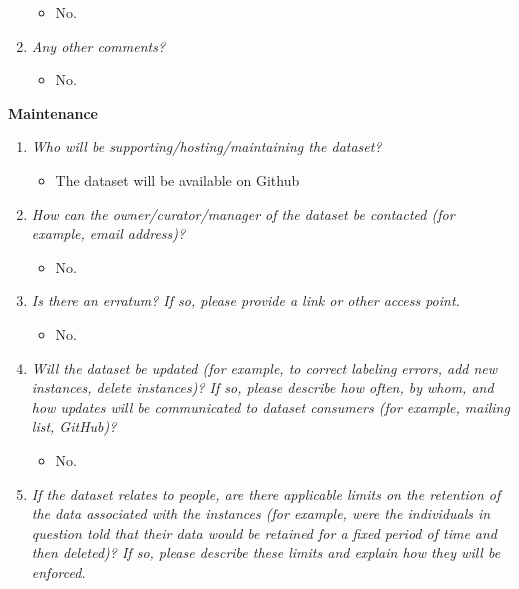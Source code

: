 \documentclass[
]{article}
\providecommand{\tightlist}{%
  \setlength{\itemsep}{0pt}\setlength{\parskip}{0pt}}
\begin{document}
\begin{enumerate}
  \begin{itemize}
  \tightlist
  \item
    No.
  \end{itemize}
\item
  \emph{Any other comments?}

  \begin{itemize}
  \tightlist
  \item
    No.
  \end{itemize}
\end{enumerate}

\textbf{Maintenance}

\begin{enumerate}
\def\labelenumi{\arabic{enumi}.}
\tightlist
\item
  \emph{Who will be supporting/hosting/maintaining the dataset?}

  \begin{itemize}
  \tightlist
  \item
    The dataset will be available on Github
  \end{itemize}
\item
  \emph{How can the owner/curator/manager of the dataset be contacted (for example, email address)?}

  \begin{itemize}
  \tightlist
  \item
    No.
  \end{itemize}
\item
  \emph{Is there an erratum? If so, please provide a link or other access point.}

  \begin{itemize}
  \tightlist
  \item
    No.
  \end{itemize}
\item
  \emph{Will the dataset be updated (for example, to correct labeling errors, add new instances, delete instances)? If so, please describe how often, by whom, and how updates will be communicated to dataset consumers (for example, mailing list, GitHub)?}

  \begin{itemize}
  \tightlist
  \item
    No.
  \end{itemize}
\item
  \emph{If the dataset relates to people, are there applicable limits on the retention of the data associated with the instances (for example, were the individuals in question told that their data would be retained for a fixed period of time and then deleted)? If so, please describe these limits and explain how they will be enforced.}


\end{enumerate}
\end{document}
